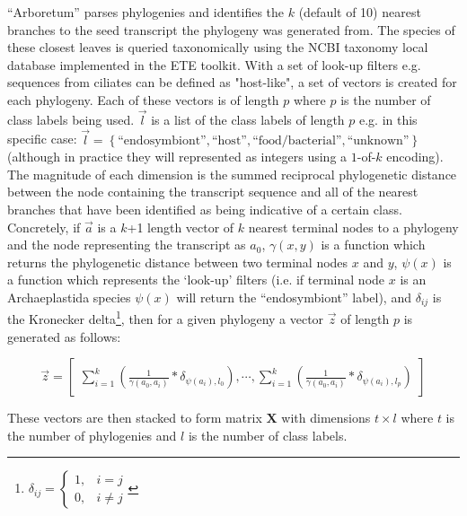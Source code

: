 ``Arboretum'' parses phylogenies and identifies the \(k\) (default of 10) nearest branches to the seed transcript
the phylogeny was generated from.  The species of these closest leaves is queried taxonomically using the
NCBI taxonomy local database implemented in the ETE toolkit.  With a set of look-up filters e.g.
sequences from ciliates can be defined as "host-like", a set of vectors is created for each phylogeny.  
Each of these vectors is of length \(p\) where \(p\) is the number of class labels being used.
\(\vec{l}\) is a list of the class labels of length \(p\) e.g. 
in this specific case: \(\vec{l} = \left\{\text{``endosymbiont''}, \text{``host''}, \text{``food/bacterial''}, \text{``unknown''}\right\}\) (although in practice they will represented as integers using a \(1\)-of-\(k\) encoding).
The magnitude of each dimension is the summed reciprocal phylogenetic distance between the node containing the 
transcript sequence and all
of the nearest branches that have been identified as being indicative of a certain class.
Concretely, if \(\vec{a}\) is a \(k\)+1 length vector of \(k\) nearest terminal nodes to a 
phylogeny and the node representing the transcript as \(a_{0}\), \(\gamma(x,y)\) 
is a function which returns the phylogenetic distance between two 
terminal nodes \(x\) and \(y\), \(\psi(x)\) is a function which represents the `look-up' filters
(i.e. if terminal node \(x\) is an Archaeplastida species \(\psi(x)\) will return the ``endosymbiont'' label),
and \(\delta_{ij}\) is the Kronecker delta\footnote{
    \(\delta_{ij}= \begin{cases}
	1, &  i = j\\
	0, & i \neq j 
    \end{cases} \)}, then for a given phylogeny a vector \(\vec{z}\) of length \(p\) is 
generated as follows:

\begin{center}
	\[
        \vec{z} = \begin{bmatrix}
            \sum_{i=1}^k \left( \frac{1}{\gamma(a_{0},a_{i})} * \delta_{\psi(a_{i}),l_{0}} \right),
            \cdots,
            \sum_{i=1}^k \left( \frac{1}{\gamma(a_{0},a_{i})} * \delta_{\psi(a_{i}),l_{p}} \right)
        \end{bmatrix}
	\]
\end{center}

These vectors are then stacked to form matrix \(\bm{X}\) with dimensions \(t \times l\) where \(t\)
is the number of phylogenies and \(l\) is the number of class labels. 

